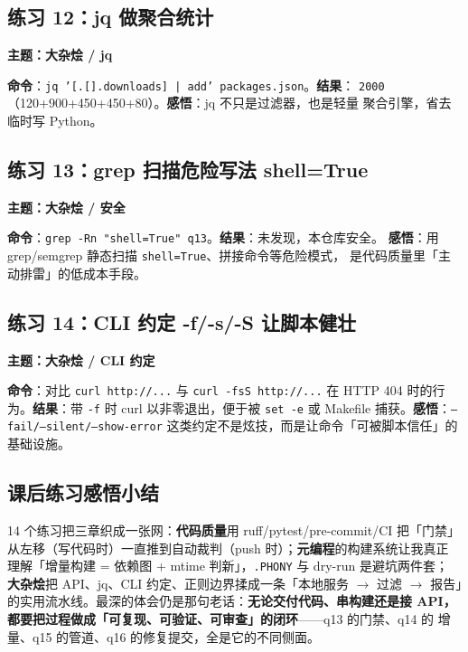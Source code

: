 \documentclass{hamesome-report}
\begin{document}
\subsection{练习 12：jq 做聚合统计}
\textbf{主题：大杂烩 / jq}\par
\textbf{命令}：\texttt{jq '[.[].downloads] | add' packages.json}。\textbf{结果}：
\texttt{2000}（120+900+450+450+80）。\textbf{感悟}：jq 不只是过滤器，也是轻量
聚合引擎，省去临时写 Python。

\subsection{练习 13：grep 扫描危险写法 shell=True}
\textbf{主题：大杂烩 / 安全}\par
\textbf{命令}：\texttt{grep -Rn "shell=True" q13}。\textbf{结果}：未发现，本仓库安全。
\textbf{感悟}：用 grep/semgrep 静态扫描 \texttt{shell=True}、拼接命令等危险模式，
是代码质量里「主动排雷」的低成本手段。

\subsection{练习 14：CLI 约定 -f/-s/-S 让脚本健壮}
\textbf{主题：大杂烩 / CLI 约定}\par
\textbf{命令}：对比 \texttt{curl http://...} 与 \texttt{curl -fsS http://...} 在
HTTP 404 时的行为。\textbf{结果}：带 \texttt{-f} 时 curl 以非零退出，便于被
\texttt{set -e} 或 Makefile 捕获。\textbf{感悟}：\texttt{--fail/--silent/--show-error}
这类约定不是炫技，而是让命令「可被脚本信任」的基础设施。

\subsection{课后练习感悟小结}
14 个练习把三章织成一张网：\textbf{代码质量}用 ruff/pytest/pre-commit/CI 把「门禁」
从左移（写代码时）一直推到自动裁判（push 时）；\textbf{元编程}的构建系统让我真正
理解「增量构建 = 依赖图 + mtime 判新」，\texttt{.PHONY} 与 dry-run 是避坑两件套；
\textbf{大杂烩}把 API、jq、CLI 约定、正则边界揉成一条「本地服务 $\to$ 过滤 $\to$
报告」的实用流水线。最深的体会仍是那句老话：\textbf{无论交付代码、串构建还是接
API，都要把过程做成「可复现、可验证、可审查」的闭环}——q13 的门禁、q14 的
增量、q15 的管道、q16 的修复提交，全是它的不同侧面。

\end{document}

